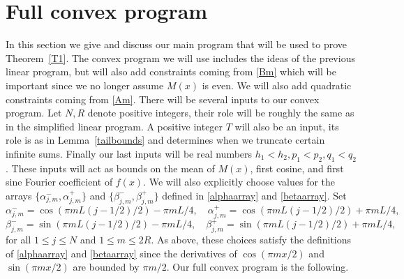 \documentclass[12pt]{article}
\numberwithin{equation}{section}
\begin{document}






\section{Full convex program}\label{fullconsec}

In this section we give and discuss our main program that will be used to prove Theorem~\ref{T1}. The convex program we will use includes the ideas of the previous linear program, but will also add constraints coming from \eqref{Bm} which will be important since we no longer assume $M(x)$ is even. We will also add quadratic constraints coming from \eqref{Am}. There will be several inputs to our convex program. Let $N,R$ denote positive integers, their role will be roughly the same as in the simplified linear program. A positive integer $T$ will also be an input, its role is as in Lemma~\ref{tailbounds} and determines when we truncate certain infinite sums. Finally our last inputs will be real numbers $h_1<h_2,p_1<p_2,q_1<q_2$. These inputs will act as bounds on the mean of $M(x)$, first cosine, and first sine Fourier coefficient of $f(x)$. We will also explicitly choose values for the arrays $\{\alpha_{j,m}^-,\alpha_{j,m}^+\}$ and $\{\beta_{j,m}^-,\beta_{j,m}^+\}$ defined in \eqref{alphaarray} and \eqref{betaarray}. Set 
\[\alpha_{j,m}^- = \cos(\pi mL(j-1/2)/2) - \pi m L/4,  \quad \alpha_{j,m}^+ = \cos(\pi mL(j-1/2)/2) + \pi m L/4,\]
\[\beta_{j,m}^- = \sin(\pi mL(j-1/2)/2) - \pi m L/4, \quad \beta_{j,m}^+ = \sin(\pi mL(j-1/2)/2) +\pi m L/4,\]
for all $1 \leq j \leq N$ and $1 \leq m \leq 2R$. As above, these choices satisfy the definitions of \eqref{alphaarray} and \eqref{betaarray} since the derivatives of $\cos(\pi m x/2)$ and $\sin(\pi m x/2)$ are bounded by $\pi m/2$. Our full convex program is the following.



\end{document}
